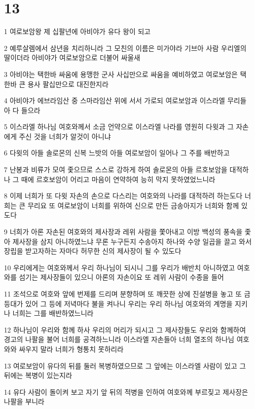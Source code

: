 \chapter{13}

\par 1 여로보암왕 제 십팔년에 아비야가 유다 왕이 되고
\par 2 예루살렘에서 삼년을 치리하니라 그 모친의 이름은 미가야라 기브아 사람 우리엘의 딸이더라 아비야가 여로보암으로 더불어 싸울새
\par 3 아비야는 택한바 싸움에 용맹한 군사 사십만으로 싸움을 예비하였고 여로보암은 택한바 큰 용사 팔십만으로 대진한지라
\par 4 아비야가 에브라임산 중 스마라임산 위에 서서 가로되 여로보암과 이스라엘 무리들아 다 들으라
\par 5 이스라엘 하나님 여호와께서 소금 언약으로 이스라엘 나라를 영원히 다윗과 그 자손에게 주신 것을 너희가 알것이 아니냐
\par 6 다윗의 아들 솔로몬의 신복 느밧의 아들 여로보암이 일어나 그 주를 배반하고
\par 7 난봉과 비류가 모여 좇으므로 스스로 강하게 하여 솔로몬의 아들 르호보암을 대적하나 그 때에 르호보암이 어리고 마음이 연약하여 능히 막지 못하였었느니라
\par 8 이제 너희가 또 다윗 자손의 손으로 다스리는 여호와의 나라를 대적하려 하는도다 너희는 큰 무리요 또 여로보암이 너희를 위하여 신으로 만든 금송아지가 너희와 함께 있도다
\par 9 너희가 아론 자손된 여호와의 제사장과 레위 사람을 쫓아내고 이방 백성의 풍속을 좇아 제사장을 삼지 아니하였느냐 무론 누구든지 수송아지 하나와 수양 일곱을 끌고 와서 장립을 받고자하는 자마다 허무한 신의 제사장이 될 수 있도다
\par 10 우리에게는 여호와께서 우리 하나님이 되시니 그를 우리가 배반치 아니하였고 여호와를 섬기는 제사장들이 있으니 아론의 자손이요 또 레위 사람이 수종을 들어
\par 11 조석으로 여호와 앞에 번제를 드리며 분향하며 또 깨끗한 상에 진설병을 놓고 또 금등대가 있어 그 등에 저녁마다 불을 켜나니 우리는 우리 하나님 여호와의 계명을 지키나 너희는 그를 배반하였느니라
\par 12 하나님이 우리와 함께 하사 우리의 머리가 되시고 그 제사장들도 우리와 함께하여 경고의 나팔을 불어 너희를 공격하느니라 이스라엘 자손들아 너희 열조의 하나님 여호와와 싸우지 말라 너희가 형통치 못하리라
\par 13 여로보암이 유다의 뒤를 둘러 복병하였으므로 그 앞에는 이스라엘 사람이 있고 그 뒤에는 복병이 있는지라
\par 14 유다 사람이 돌이켜 보고 자기 앞 뒤의 적병을 인하여 여호와께 부르짖고 제사장은 나팔을 부니라
